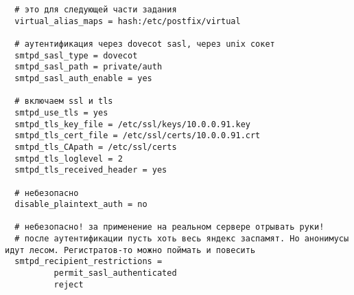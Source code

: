 \documentclass[a4paper,10pt]{report}
\begin{document}
\begin{enumerate}
\begin{verbatim}
  # это для следующей части задания
  virtual_alias_maps = hash:/etc/postfix/virtual

  # аутентификация через dovecot sasl, через unix сокет
  smtpd_sasl_type = dovecot
  smtpd_sasl_path = private/auth
  smtpd_sasl_auth_enable = yes

  # включаем ssl и tls
  smtpd_use_tls = yes
  smtpd_tls_key_file = /etc/ssl/keys/10.0.0.91.key
  smtpd_tls_cert_file = /etc/ssl/certs/10.0.0.91.crt
  smtpd_tls_CApath = /etc/ssl/certs
  smtpd_tls_loglevel = 2
  smtpd_tls_received_header = yes

  # небезопасно
  disable_plaintext_auth = no

  # небезопасно! за применение на реальном сервере отрывать руки!
  # после аутентификации пусть хоть весь яндекс заспамят. Но анонимусы идут лесом. Регистратов-то можно поймать и повесить
  smtpd_recipient_restrictions =
          permit_sasl_authenticated
          reject


\end{verbatim}
\end{enumerate}
\end{document}
